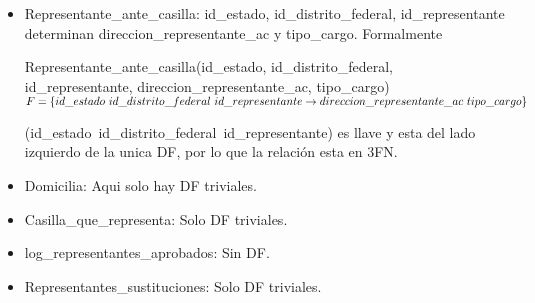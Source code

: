 \documentclass[a4paper,twoside,11pt]{article}
\begin{document}
\begin{itemize}
  \item Representante\_ante\_casilla: id\_estado, id\_distrito\_federal, id\_representante determinan
        direccion\_representante\_ac y tipo\_cargo. Formalmente

        Representante\_ante\_casilla(id\_estado, id\_distrito\_federal, id\_representante,
        direccion\_representante\_ac, tipo\_cargo)\\
        $F=\{id\_estado~id\_distrito\_federal~id\_representante\rightarrow\\
        direccion\_representante\_ac~tipo\_cargo\}$

        (id\_estado~id\_distrito\_federal~id\_representante) es llave y esta del lado izquierdo de la unica DF,
        por lo que la relación esta en 3FN.

  \item Domicilia: Aqui solo hay DF triviales.
  \item Casilla\_que\_representa: Solo DF triviales.
  \item log\_representantes\_aprobados: Sin DF.
  \item Representantes\_sustituciones: Solo DF triviales.

\end{itemize}
\end{document}
